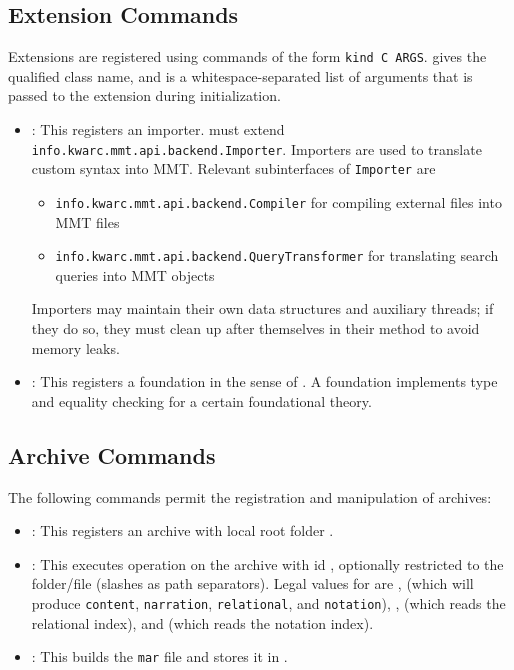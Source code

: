 \subsection{Extension Commands}\label{sec:shell:extensions}
Extensions are registered using commands of the form \texttt{kind C ARGS}.  gives the qualified class name, and  is a whitespace-separated list of arguments that is passed to the extension during initialization.

\begin{itemize}
\item {}: This registers an importer.  must extend \texttt{info.kwarc.mmt.api.backend.Importer}. Importers are used to translate custom syntax into MMT. Relevant subinterfaces of \texttt{Importer} are
  \begin{itemize}
    \item \texttt{info.kwarc.mmt.api.backend.Compiler} for compiling external files into MMT files
    \item \texttt{info.kwarc.mmt.api.backend.QueryTransformer} for translating search queries into MMT objects
  \end{itemize}
Importers may maintain their own data structures and auxiliary threads; if they do so, they must clean up after themselves in their  method to avoid memory leaks.
\item {}: This registers a foundation in the sense of \cite{RK:mmt:10}. A foundation implements type and equality checking for a certain foundational theory.
\end{itemize}

\subsection{Archive Commands}\label{sec:shell:archives}
The following commands permit the registration and manipulation of archives:

\begin{itemize}
\item {}: This registers an archive with local root folder .
\item {}: This executes operation  on the archive with id , optionally restricted to the folder/file  (slashes as path separators). Legal values for  are ,  (which will produce \texttt{content}, \texttt{narration}, \texttt{relational}, and \texttt{notation}), ,  (which reads the relational index), and  (which reads the notation index).
\item {}: This builds the \texttt{mar} file and stores it in .
\end{itemize}

